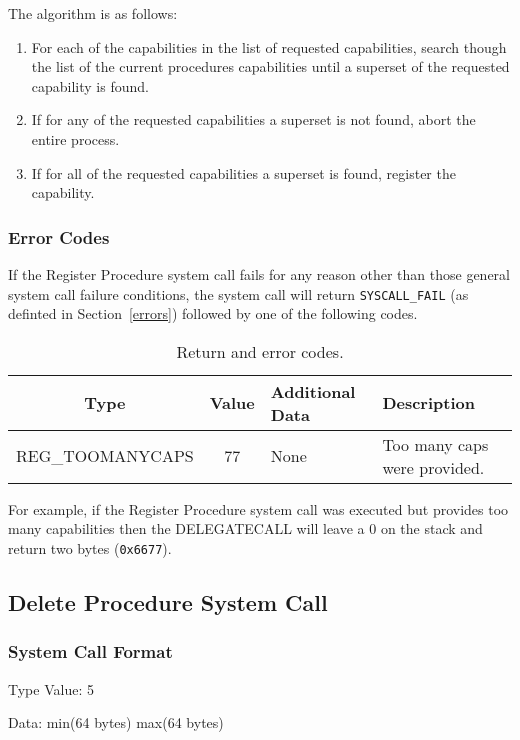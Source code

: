 \documentclass[english,a4paper]{article}
\let\oldparagraph\subsubsection
\renewcommand{\subsubsection}[1]{\oldparagraph{#1}\mbox{}}
\begin{document}
The algorithm is as follows:

\begin{enumerate}
  \item For each of the capabilities in the list of requested capabilities,
  search though the list of the current procedures capabilities until a superset
  of the requested capability is found.
  \item If for any of the requested capabilities a superset is not found, abort
  the entire process.
  \item If for all of the requested capabilities a superset is found, register
  the capability.
\end{enumerate}

\subsubsection{Error Codes}
If the Register Procedure system call fails for any reason other than those
general system call failure conditions, the system call will return
\texttt{SYSCALL\_FAIL} (as definted in Section~\ref{errors}) followed by one of
the following codes.

\begin{table}[H]
  \caption{Return and error codes.}
  \centering{}%
  \begin{tabularx}{\textwidth}{c|c|l|X}
    \hline
    Type & Value & Additional Data & Description \\
    \hline
    \hline
    REG\_TOOMANYCAPS  & 77 & None & Too many caps were provided. \\
    \hline
  \end{tabularx}
\end{table}

For example, if the Register
Procedure system call was executed but provides too many capabilities then the
DELEGATECALL will leave a 0 on the stack and return two bytes (\texttt{0x6677}).

\subsection{Delete Procedure System Call}

\subsubsection{System Call Format}
Type Value: 5

Data: min(64 bytes) max(64 bytes)
\end{document}
